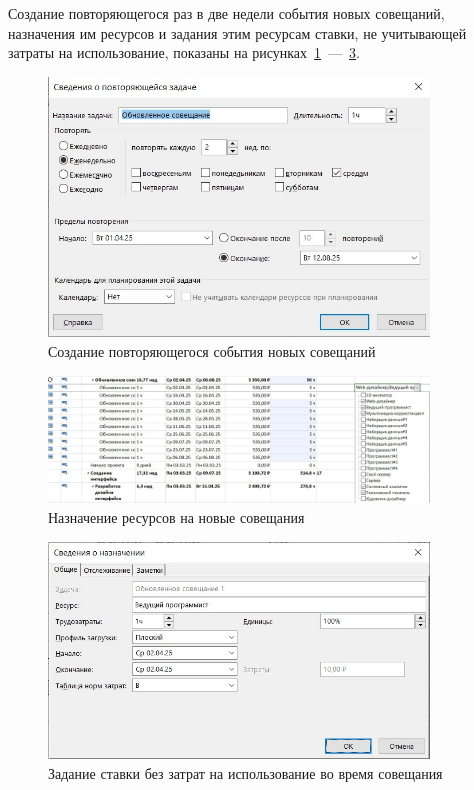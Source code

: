 Создание повторяющегося раз в две недели события новых совещаний, назначения им ресурсов и задания этим ресурсам ставки, не учитывающей затраты на использование, показаны на рисунках~\ref{fig:screen13}~---~\ref{fig:screen15}.

\begin{figure}[H]
	\centering
	\includegraphics[width=0.9\textwidth]{img/lab4/screen13.jpg}
	\caption{Создание повторяющегося события новых совещаний}
	\label{fig:screen13}
\end{figure}

\begin{figure}[H]
	\centering
	\includegraphics[width=0.9\textwidth]{img/lab4/screen14.jpg}
	\caption{Назначение ресурсов на новые совещания}
	\label{fig:screen14}
\end{figure}

\begin{figure}[H]
	\centering
	\includegraphics[width=0.9\textwidth]{img/lab4/screen15.jpg}
	\caption{Задание ставки без затрат на использование во время совещания}
	\label{fig:screen15}
\end{figure}

